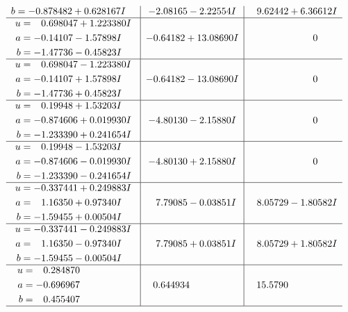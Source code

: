 \documentclass[1p]{elsarticle_modified}
\theoremstyle{definition}
\begin{document}
$$\begin{array}{c|c|c}
\begin{aligned}
b &= -0.878482 + 0.628167 I\end{aligned}
 & -2.08165 - 2.22554 I & \phantom{-}9.62442 + 6.36612 I \\ \hline\begin{aligned}
u &= \phantom{-}0.698047 + 1.223380 I \\
a &= -0.14107 - 1.57898 I \\
b &= -1.47736 - 0.45823 I\end{aligned}
 & -0.64182 + 13.08690 I & \phantom{-0.000000 } 0 \\ \hline\begin{aligned}
u &= \phantom{-}0.698047 - 1.223380 I \\
a &= -0.14107 + 1.57898 I \\
b &= -1.47736 + 0.45823 I\end{aligned}
 & -0.64182 - 13.08690 I & \phantom{-0.000000 } 0 \\ \hline\begin{aligned}
u &= \phantom{-}0.19948 + 1.53203 I \\
a &= -0.874606 + 0.019930 I \\
b &= -1.233390 + 0.241654 I\end{aligned}
 & -4.80130 - 2.15880 I & \phantom{-0.000000 } 0 \\ \hline\begin{aligned}
u &= \phantom{-}0.19948 - 1.53203 I \\
a &= -0.874606 - 0.019930 I \\
b &= -1.233390 - 0.241654 I\end{aligned}
 & -4.80130 + 2.15880 I & \phantom{-0.000000 } 0 \\ \hline\begin{aligned}
u &= -0.337441 + 0.249883 I \\
a &= \phantom{-}1.16350 + 0.97340 I \\
b &= -1.59455 + 0.00504 I\end{aligned}
 & \phantom{-}7.79085 - 0.03851 I & \phantom{-}8.05729 - 1.80582 I \\ \hline\begin{aligned}
u &= -0.337441 - 0.249883 I \\
a &= \phantom{-}1.16350 - 0.97340 I \\
b &= -1.59455 - 0.00504 I\end{aligned}
 & \phantom{-}7.79085 + 0.03851 I & \phantom{-}8.05729 + 1.80582 I \\ \hline\begin{aligned}
u &= \phantom{-}0.284870\phantom{ +0.000000I} \\
a &= -0.696967\phantom{ +0.000000I} \\
b &= \phantom{-}0.455407\phantom{ +0.000000I}\end{aligned}
 & \phantom{-}0.644934\phantom{ +0.000000I} & \phantom{-}15.5790\phantom{ +0.000000I}\\
 \hline 
 \end{array}$$\newpage\newpage\renewcommand{\arraystretch}{1}
\end{document}
